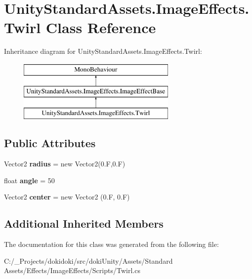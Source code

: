 \hypertarget{class_unity_standard_assets_1_1_image_effects_1_1_twirl}{}\section{Unity\+Standard\+Assets.\+Image\+Effects.\+Twirl Class Reference}
\label{class_unity_standard_assets_1_1_image_effects_1_1_twirl}
Inheritance diagram for Unity\+Standard\+Assets.\+Image\+Effects.\+Twirl\+:\begin{figure}[H]
\begin{center}
\leavevmode
\includegraphics[height=3.000000cm]{class_unity_standard_assets_1_1_image_effects_1_1_twirl}
\end{center}
\end{figure}
\subsection*{Public Attributes}
\begin{DoxyCompactItemize}
\item 
Vector2 {\bfseries radius} = new Vector2(0.\+F,0.\+F)\hypertarget{class_unity_standard_assets_1_1_image_effects_1_1_twirl_afc518f269f3911fb92018723a1e36555}{}\label{class_unity_standard_assets_1_1_image_effects_1_1_twirl_afc518f269f3911fb92018723a1e36555}

\item 
float {\bfseries angle} = 50\hypertarget{class_unity_standard_assets_1_1_image_effects_1_1_twirl_abd4cbc16b5f2cbabb830dbbf479dde74}{}\label{class_unity_standard_assets_1_1_image_effects_1_1_twirl_abd4cbc16b5f2cbabb830dbbf479dde74}

\item 
Vector2 {\bfseries center} = new Vector2 (0.\+F, 0.\+F)\hypertarget{class_unity_standard_assets_1_1_image_effects_1_1_twirl_acb5cbb5172906a0f3ae49e6ee1dbbdfc}{}\label{class_unity_standard_assets_1_1_image_effects_1_1_twirl_acb5cbb5172906a0f3ae49e6ee1dbbdfc}

\end{DoxyCompactItemize}
\subsection*{Additional Inherited Members}


The documentation for this class was generated from the following file\+:\begin{DoxyCompactItemize}
\item 
C\+:/\+\_\+\+Projects/dokidoki/src/doki\+Unity/\+Assets/\+Standard Assets/\+Effects/\+Image\+Effects/\+Scripts/Twirl.\+cs\end{DoxyCompactItemize}
